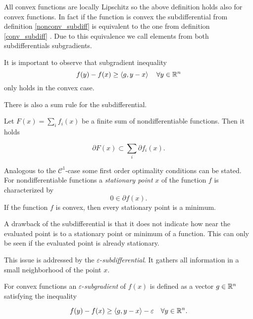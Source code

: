 All convex functions are locally Lipschitz \cite[Theorem 3.1.1, p. 16]{Hiriart-Urruty1996} so the above definition holds also for convex functions. In fact if the function is convex the subdifferential from definition \ref{nonconv_subdiff} is equivalent to the one from definition \ref{conv_subdiff} \cite[Proposition 2.2.7, p. 36]{Clarke1990}.
Due to this equivalence we call elements from both subdifferentials subgradients.

\begin{remark}
	It is important to observe that subgradient inequality 
	\begin{equation}
	f(y)-f(x) \geq \left\langle g,y-x \right\rangle \quad \forall y \in \mathbb{R}^n 
\label{subgr_inequ}
\end{equation}
	only holds in the convex case.
\end{remark}

There is also a sum rule for the subdifferential.

\begin{proposition}
	Let \(F(x)=\sum_i{f_i(x)}\) be a finite sum of nondifferentiable functions. Then it holds
	
	\[ \partial F(x) \subset \sum_i{\partial f_i(x)}. \]
\end{proposition}

Analogous to the \(\mathcal{C}^1\)-case some first order optimality conditions can be stated.
For nondifferentiable functions a \emph{stationary point} \(x\) of the function \(f\) is characterized by \cite[p. 38]{Clarke1990}
\[ 0 \in \partial f(x). \]
If the function \(f\) is convex, then every stationary point is a minimum.


A drawback of the subdifferential is that it does not indicate how near the evaluated point is to a stationary point or minimum of a function. This can only be seen if the evaluated point is already stationary.

This issue is addressed by the \(\varepsilon\)-\emph{subdifferential}. It gathers all information in a small neighborhood of the point \(x\).

For convex functions an \(\varepsilon\)-\emph{subgradient} of \(f(x)\) is defined as a vector \(g \in \mathbb{R}^n\) satisfying the inequality

\[ f(y)-f(x) \geq \left\langle g,y-x \right\rangle - \varepsilon \quad \forall y \in \mathbb{R}^n.\]

